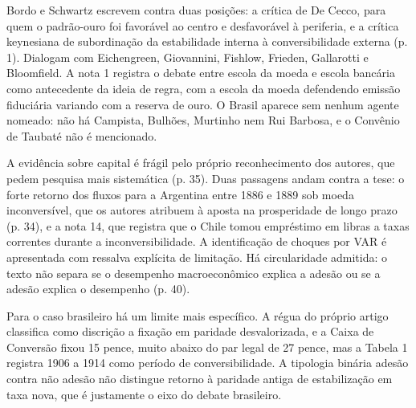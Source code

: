 Bordo e Schwartz escrevem contra duas posições: a crítica de De Cecco, para
quem o padrão-ouro foi favorável ao centro e desfavorável à periferia, e a
crítica keynesiana de subordinação da estabilidade interna à conversibilidade
externa (p. 1). Dialogam com Eichengreen, Giovannini, Fishlow, Frieden,
Gallarotti e Bloomfield. A nota 1 registra o debate entre escola da moeda e
escola bancária como antecedente da ideia de regra, com a escola da moeda
defendendo emissão fiduciária variando com a reserva de ouro. O Brasil aparece
sem nenhum agente nomeado: não há Campista, Bulhões, Murtinho nem Rui Barbosa,
e o Convênio de Taubaté não é mencionado.

A evidência sobre capital é frágil pelo próprio reconhecimento dos autores, que
pedem pesquisa mais sistemática (p. 35). Duas passagens andam contra a tese: o
forte retorno dos fluxos para a Argentina entre 1886 e 1889 sob moeda
inconversível, que os autores atribuem à aposta na prosperidade de longo prazo
(p. 34), e a nota 14, que registra que o Chile tomou empréstimo em libras a
taxas correntes durante a inconversibilidade. A identificação de choques por
VAR é apresentada com ressalva explícita de limitação. Há circularidade
admitida: o texto não separa se o desempenho macroeconômico explica a adesão ou
se a adesão explica o desempenho (p. 40).

Para o caso brasileiro há um limite mais específico. A régua do próprio artigo
classifica como discrição a fixação em paridade desvalorizada, e a Caixa de
Conversão fixou 15 pence, muito abaixo do par legal de 27 pence, mas a Tabela 1
registra 1906 a 1914 como período de conversibilidade. A tipologia binária
adesão contra não adesão não distingue retorno à paridade antiga de
estabilização em taxa nova, que é justamente o eixo do debate brasileiro.


